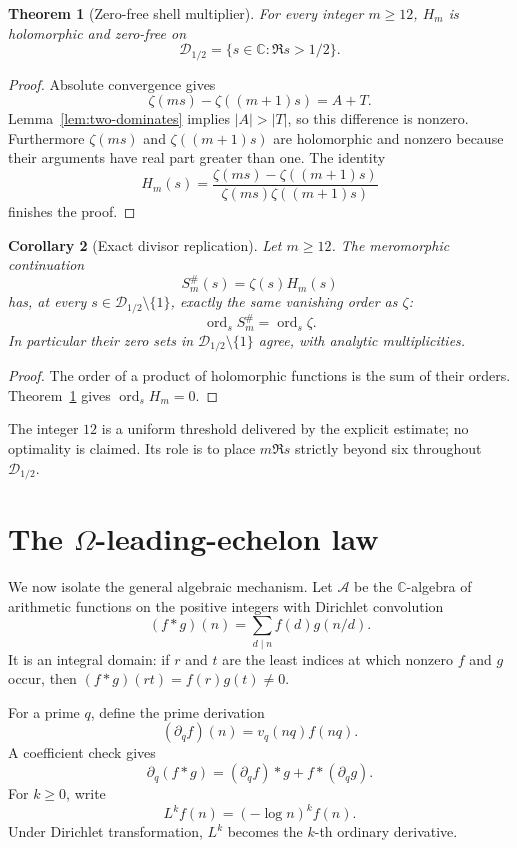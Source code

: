 \documentclass[11pt]{article}
\newtheorem{theorem}{Theorem}[section]
\newtheorem{corollary}[theorem]{Corollary}
\theoremstyle{definition}
\theoremstyle{remark}
\newcommand{\C}{\mathbb C}
\newcommand{\cA}{\mathcal A}
\newcommand{\cD}{\mathcal D}
\newcommand{\ord}{\operatorname{ord}}
\begin{document}
\begin{theorem}[Zero-free shell multiplier]\label{thm:zero-free}
For every integer \(m\geq12\), \(H_m\) is holomorphic and zero-free on
\[
 \cD_{1/2}=\{s\in\C:\Re s>1/2\}.
\]
\end{theorem}

\begin{proof}
Absolute convergence gives
\[
 \zeta(ms)-\zeta((m+1)s)=A+T.
\]
Lemma~\ref{lem:two-dominates} implies \(|A|>|T|\), so this difference is nonzero.
Furthermore \(\zeta(ms)\) and \(\zeta((m+1)s)\) are holomorphic and nonzero because their
arguments have real part greater than one.  The identity
\[
 H_m(s)=
 \frac{\zeta(ms)-\zeta((m+1)s)}
 {\zeta(ms)\zeta((m+1)s)}
\]
finishes the proof.
\end{proof}

\begin{corollary}[Exact divisor replication]\label{cor:divisor}
Let \(m\geq12\).  The meromorphic continuation
\[
 S_m^\#(s)=\zeta(s)H_m(s)
\]
has, at every \(s\in\cD_{1/2}\setminus\{1\}\), exactly the same vanishing order as \(\zeta\):
\[
 \ord_s S_m^\#=\ord_s\zeta.
 \tag{3.2}
\]
In particular their zero sets in \(\cD_{1/2}\setminus\{1\}\) agree, with analytic
multiplicities.
\end{corollary}

\begin{proof}
The order of a product of holomorphic functions is the sum of their orders.
Theorem~\ref{thm:zero-free} gives \(\ord_sH_m=0\).
\end{proof}

The integer \(12\) is a uniform threshold delivered by the explicit estimate; no optimality is
claimed.  Its role is to place \(m\Re s\) strictly beyond six throughout \(\cD_{1/2}\).

\section{The \texorpdfstring{\(\Omega\)}{Omega}-leading-echelon law}\label{sec:omega}

We now isolate the general algebraic mechanism.  Let \(\cA\) be the \(\C\)-algebra of arithmetic
functions on the positive integers with Dirichlet convolution
\[
 (f*g)(n)=\sum_{d\mid n}f(d)g(n/d).
\]
It is an integral domain: if \(r\) and \(t\) are the least indices at which nonzero \(f\) and
\(g\) occur, then \((f*g)(rt)=f(r)g(t)\ne0\).

For a prime \(q\), define the prime derivation
\[
 (\partial_qf)(n)=v_q(nq)f(nq).
 \tag{4.1}
\]
A coefficient check gives
\[
 \partial_q(f*g)=(\partial_qf)*g+f*(\partial_qg).
 \tag{4.2}
\]
For \(k\geq0\), write
\[
 L^kf(n)=(-\log n)^k f(n).
 \tag{4.3}
\]
Under Dirichlet transformation, \(L^k\) becomes the \(k\)-th ordinary derivative.
\end{document}
